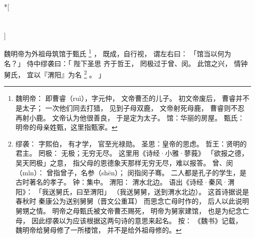 
\switchcolumn[0]*[\section{}]

魏明帝为外祖母筑馆于甄氏%
\footnote{%
    魏明帝：
        即曹睿（ruì），字元仲，
        文帝曹丕的儿子。
        初文帝废后，
        曹睿并不是太子；
        一次他们同去打猎，
        见到子母双鹿，
        文帝射死母鹿，
        曹睿则不忍再射小鹿。
        文帝认为他很善良，
        于是定为太子。
    馆：华丽的房屋。
    甄氏：明帝的母亲姓甄，这里指甄家。
}%
，
既成，自行视，
谓左右曰：
「馆当以何为名？」
侍中缪袭曰：「
    陛下圣思
    齐于哲王，
    罔极过于曾、闵。
    此馆之兴，
    情钟舅氏，
    宜以『渭阳』为名%
    \footnote{%
        缪袭：
            字熙伯，
            有才学，
            官至光禄勋。
        圣思：皇帝的思虑。
        哲王：贤明的君主。
        罔极：
            无极；无穷无尽。
            这里用《诗经·小雅·蓼莪》
            「欲报之德，吴天罔极」之意，
            指父母的恩德象天那样无穷无尽，难以报答。
        曾、闵（mǐn）：
            曾指曾子，名参（shēn）；
            闵指闵子骞。
            二人都是孔子的学生，是古时著名的孝子。
        钟：集中。
        渭阳：
            渭水北边。
            语出《诗经·秦风·渭阳》：
            「我送舅氏，曰至渭阳」
            （我送舅舅，送到渭水北边）。
            这首诗据说是春秋时
            秦康公为送别舅舅（晋文公重耳）
            而思念亡母时作的，
            后人以此说明舅甥之情。
            明帝之母甄氏被文帝曹丕赐死，
            明帝为舅家建馆，
            也是为纪念亡母，
            因此缪袭以为应该根据这两句诗的意思来起名。
        按：
            《魏书》记载，
            魏明帝给舅母修了一所楼馆，
            并不是给外祖母修的。
    }%
    。
」

\switchcolumn



